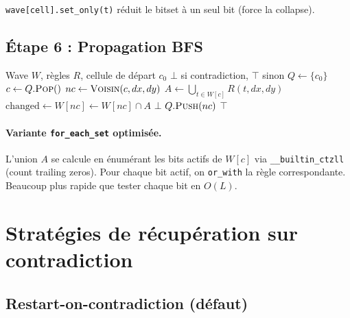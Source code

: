 \texttt{wave[cell].set\_only(t)} réduit le bitset à un seul bit (force la collapse).

\subsection{Étape 6 : Propagation BFS}

\begin{algorithm}[H]
\caption{Propagation BFS niveau-synchrone}
\begin{algorithmic}[1]
\Require Wave $W$, règles $R$, cellule de départ $c_0$
\Ensure $\bot$ si contradiction, $\top$ sinon
\State $Q \gets \{c_0\}$
    \State $c \gets Q.\textsc{Pop}()$
        \State $nc \gets \textsc{Voisin}(c, dx, dy)$
        \State $A \gets \bigcup_{t \in W[c]} R(t, dx, dy)$ 
        \State $\text{changed} \gets W[nc] \gets W[nc] \cap A$ 
                \State \Return $\bot$ 
            \EndIf
            \State $Q.\textsc{Push}(nc)$
        \EndIf
    \EndFor
\EndWhile
\State \Return $\top$
\end{algorithmic}
\end{algorithm}

\paragraph{Variante \texttt{for\_each\_set} optimisée.} L'union $A$ se calcule en énumérant les bits actifs de $W[c]$ via \texttt{\_\_builtin\_ctzll} (count trailing zeros). Pour chaque bit actif, on \texttt{or\_with} la règle correspondante. Beaucoup plus rapide que tester chaque bit en $O(L)$.

\section{Stratégies de récupération sur contradiction}
\label{sec:approche:retry}

\subsection{Restart-on-contradiction (défaut)}


